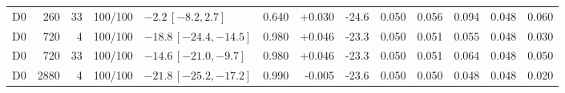 \documentclass[10pt,a4paper]{article}
\begin{document}
\begin{longtable}{crrcp{33mm}rrrrrrrr}
D0 & 260 & 33 & 100/100 & \(-2.2\,[-8.2,2.7]\) & 0.640 & +0.030 & -24.6 & 0.050 & 0.056 & 0.094 & 0.048 & 0.060\\
D0 & 720 & 4 & 100/100 & \(-18.8\,[-24.4,-14.5]\) & 0.980 & +0.046 & -23.3 & 0.050 & 0.051 & 0.055 & 0.048 & 0.030\\
D0 & 720 & 33 & 100/100 & \(-14.6\,[-21.0,-9.7]\) & 0.980 & +0.046 & -23.3 & 0.050 & 0.051 & 0.064 & 0.048 & 0.050\\
D0 & 2880 & 4 & 100/100 & \(-21.8\,[-25.2,-17.2]\) & 0.990 & -0.005 & -23.6 & 0.050 & 0.050 & 0.048 & 0.048 & 0.020\\

\end{longtable}
\end{document}
